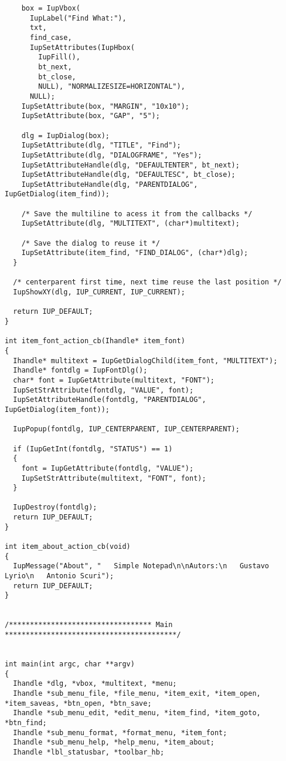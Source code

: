 \documentclass{ctexart}
\begin{document}
\begin{lstlisting}
    box = IupVbox(
      IupLabel("Find What:"),
      txt,
      find_case,
      IupSetAttributes(IupHbox(
        IupFill(),
        bt_next,
        bt_close,
        NULL), "NORMALIZESIZE=HORIZONTAL"),
      NULL);
    IupSetAttribute(box, "MARGIN", "10x10");
    IupSetAttribute(box, "GAP", "5");

    dlg = IupDialog(box);
    IupSetAttribute(dlg, "TITLE", "Find");
    IupSetAttribute(dlg, "DIALOGFRAME", "Yes");
    IupSetAttributeHandle(dlg, "DEFAULTENTER", bt_next);
    IupSetAttributeHandle(dlg, "DEFAULTESC", bt_close);
    IupSetAttributeHandle(dlg, "PARENTDIALOG", IupGetDialog(item_find));

    /* Save the multiline to acess it from the callbacks */
    IupSetAttribute(dlg, "MULTITEXT", (char*)multitext);

    /* Save the dialog to reuse it */
    IupSetAttribute(item_find, "FIND_DIALOG", (char*)dlg);
  }

  /* centerparent first time, next time reuse the last position */
  IupShowXY(dlg, IUP_CURRENT, IUP_CURRENT);

  return IUP_DEFAULT;
}

int item_font_action_cb(Ihandle* item_font)
{
  Ihandle* multitext = IupGetDialogChild(item_font, "MULTITEXT");
  Ihandle* fontdlg = IupFontDlg();
  char* font = IupGetAttribute(multitext, "FONT");
  IupSetStrAttribute(fontdlg, "VALUE", font);
  IupSetAttributeHandle(fontdlg, "PARENTDIALOG", IupGetDialog(item_font));

  IupPopup(fontdlg, IUP_CENTERPARENT, IUP_CENTERPARENT);

  if (IupGetInt(fontdlg, "STATUS") == 1)
  {
    font = IupGetAttribute(fontdlg, "VALUE");
    IupSetStrAttribute(multitext, "FONT", font);
  }

  IupDestroy(fontdlg);
  return IUP_DEFAULT;
}

int item_about_action_cb(void)
{
  IupMessage("About", "   Simple Notepad\n\nAutors:\n   Gustavo Lyrio\n   Antonio Scuri");
  return IUP_DEFAULT;
}


/********************************** Main *****************************************/


int main(int argc, char **argv)
{
  Ihandle *dlg, *vbox, *multitext, *menu;
  Ihandle *sub_menu_file, *file_menu, *item_exit, *item_open, *item_saveas, *btn_open, *btn_save;
  Ihandle *sub_menu_edit, *edit_menu, *item_find, *item_goto, *btn_find;
  Ihandle *sub_menu_format, *format_menu, *item_font;
  Ihandle *sub_menu_help, *help_menu, *item_about;
  Ihandle *lbl_statusbar, *toolbar_hb;


\end{lstlisting}
\end{document}
